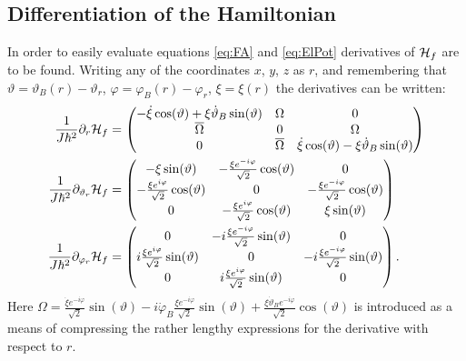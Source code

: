 \documentclass[a4paper]{article}
\begin{document}
\subsection{Differentiation of the Hamiltonian}\label{sec:Hdiff}
In order to easily evaluate equations \ref{eq:FA} and \ref{eq:ElPot} derivatives of
\(\mathbb{\cal H}_f\) are to be found. Writing any of the coordinates \(x\), \(y\), \(z\)
as \(r\), and remembering that \(\vartheta=\vartheta_B(r) -
\vartheta_r\), \(\varphi=\varphi_B(r) - \varphi_r\), \(\xi = \xi(r)\) the derivatives can
be written:
\begin{align}
        \frac{1}{J\hbar{}^2}  \partial_r\mathbb{\cal H}_f  &= \pmqty{
 -\dot \xi \cos(\vartheta) + \xi \dot \vartheta_B \sin(\vartheta) & \Omega & 0 \\
 \overline{\Omega} & 0 & \Omega\\
 0 & \overline{\Omega}& \dot \xi \cos(\vartheta)- \xi \dot \vartheta_B
\sin(\vartheta)
        }\\
        \frac{1}{J\hbar{}^2}\partial_{\vartheta_r} \mathbb{\cal H}_f &= \pmqty{
                 -\xi\sin(\vartheta) &
                -\frac{\xi e^{-i\varphi}}{\sqrt{2}}\cos(\vartheta)&0 \\
                -\frac{\xi e^{i\varphi}}{\sqrt{2}}\cos(\vartheta)& 0 &
                -\frac{\xi e^{-i\varphi}}{\sqrt{2}}\cos(\vartheta)\\
                0 & -\frac{\xi e^{i\varphi}}{\sqrt{2}}\cos(\vartheta) & \xi
                \sin(\vartheta)
        }\\
        \frac{1}{J\hbar{}^2}\partial_{\varphi_r} \mathbb{\cal H}_f &= \pmqty{
                 0 & -i\frac{\xi e^{-i\varphi}}{\sqrt{2}}\sin(\vartheta) & 0\\
                 i\frac{\xi e^{i\varphi}}{\sqrt{2}}\sin(\vartheta) & 0 & -i\frac{\xi
                e^{-i\varphi}}{\sqrt{2}}\sin(\vartheta)\\
                 0 & i\frac{\xi e^{i\varphi}}{\sqrt{2}}\sin(\vartheta) & 0
        }
.\end{align}
Here \(\Omega = \frac{\dot \xi
e^{-i\varphi}}{\sqrt{2} }\sin(\vartheta) - i\dot \varphi_B \frac{\xi
e^{-i\varphi}}{\sqrt{2}}\sin(\vartheta) + \frac{\xi \dot \vartheta_B
e^{-i\varphi}}{\sqrt{2}}\cos(\vartheta)\) is introduced as a means of compressing the
rather lengthy expressions for the derivative with respect to \(r\).
\end{document}
